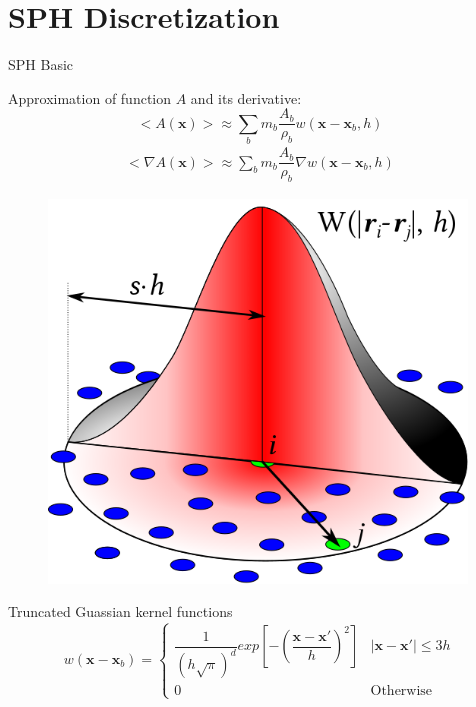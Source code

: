 \documentclass{beamer}
\begin{document}
\section{SPH Discretization}
\begin{frame}{SPH Basic}
\noindent
\begin{minipage}{0.63 \textwidth}
Approximation of function $A$ and its derivative:
\begin{equation}
<A\left(\textbf{x}\right)> \approx \sum_b m_b \dfrac{A_b}{\rho_b} w\left(\textbf{x}-\textbf{x}_b, h\right)
\label{eq:SPH-approximation-sum}
\end{equation}
\begin{equation}
\begin{split}
<\nabla A\left(\textbf{x}\right)> \approx \sum_b m_b \dfrac{A_b}{\rho_b} \nabla w\left(\textbf{x} - \textbf{x}_b, h\right)
\end{split} 
\label{eq:SPH-scalar-function-gradient}
\end{equation}
\end{minipage}
\begin{minipage}{0.36 \textwidth}
\begin{figure}
\center
\includegraphics[width=0.99\textwidth]{./PPT/SPH-interpolation}
\end{figure}
\end{minipage}

Truncated Guassian kernel functions
\begin{equation}
w\left(\textbf{x} - \textbf{x}_b\right) = 
\begin{cases} 
      \dfrac{1}{\left(h \sqrt{\pi}\right)^d} exp \left[- \left(\dfrac{\textbf{x} - \textbf{x} \prime}{h} \right)^2 \right] &  \vert \textbf{x} - \textbf{x} \prime \vert \leq 3h\\
      0 & \text{Otherwise}
\end{cases}
\label{eq:SPH-kernel}
\end{equation}
\end{frame}
\end{document}
